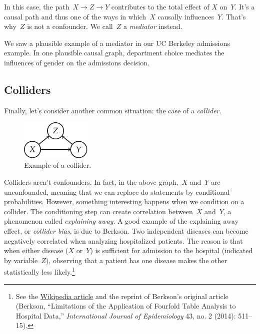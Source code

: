 \documentclass{tufte-book}
\begin{document}
In this case, the path~\(X\to Z\to Y\) contributes to the total effect
of \(X\) on~\(Y\). It's a causal path and thus one of the ways in
which~\(X\) causally influences~\(Y\). That's why~\(Z\) is not a
confounder. We call~\(Z\) a \emph{mediator} instead.

We saw a plausible example of a mediator in our UC Berkeley admissions
example. In one plausible causal graph, department choice mediates the
influences of gender on the admissions decision.

\hypertarget{colliders}{%
\subsection{Colliders}\label{colliders}}

Finally, let's consider another common situation: the case of a
\emph{collider}.

\begin{figure}
\centering
\includegraphics[width=0.3\textwidth,height=\textheight]{assets/causal-collider}
\caption{Example of a collider.}
\end{figure}

Colliders aren't confounders. In fact, in the above graph,~\(X\)
and~\(Y\) are unconfounded, meaning that we can replace do-statements by
conditional probabilities. However, something interesting happens when
we condition on a collider. The conditioning step can create correlation
between~\(X\) and~\(Y\), a phenomenon called \emph{explaining away}. A
good example of the explaining away effect, or \emph{collider bias}, is
due to Berkson. Two independent diseases can become negatively
correlated when analyzing hospitalized patients. The reason is that when
either disease (\(X\) or~\(Y\)) is sufficient for admission to the
hospital (indicated by variable~\(Z\)), observing that a patient has one
disease makes the other statistically less likely.\footnote{See the
  \href{https://en.wikipedia.org/wiki/Berkson\%27s_paradox}{Wikipedia
  article} and the reprint of Berkson's original article (Berkson,
  {``Limitations of the Application of Fourfold Table Analysis to
  Hospital Data,''} \emph{International Journal of Epidemiology} 43, no.
  2 (2014): 511--15).}
\end{document}
